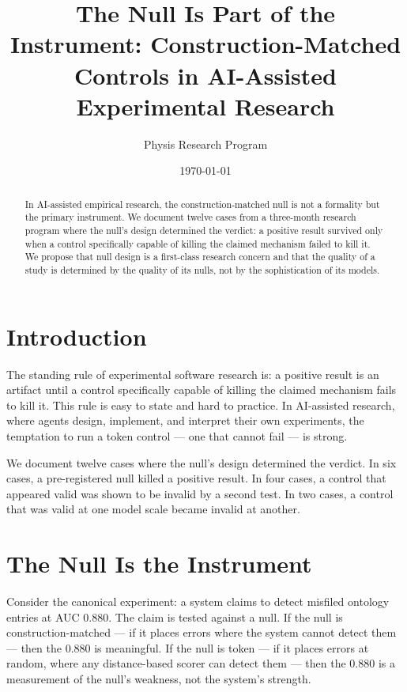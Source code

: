 \documentclass[11pt]{article}
\title{The Null Is Part of the Instrument: Construction-Matched Controls in AI-Assisted Experimental Research}
\author{Physis Research Program}
\date{\today}
\begin{document}
\maketitle

\begin{abstract}
In AI-assisted empirical research, the construction-matched null is not a
formality but the primary instrument. We document twelve cases from a
three-month research program where the null's design determined the
verdict: a positive result survived only when a control specifically
capable of killing the claimed mechanism failed to kill it. We propose
that null design is a first-class research concern and that the quality
of a study is determined by the quality of its nulls, not by the
sophistication of its models.
\end{abstract}

\section{Introduction}

The standing rule of experimental software research is: a positive result
is an artifact until a control specifically capable of killing the
claimed mechanism fails to kill it. This rule is easy to state and hard
to practice. In AI-assisted research, where agents design, implement, and
interpret their own experiments, the temptation to run a token control
--- one that cannot fail --- is strong.

We document twelve cases where the null's design determined the verdict.
In six cases, a pre-registered null killed a positive result. In four
cases, a control that appeared valid was shown to be invalid by a second
test. In two cases, a control that was valid at one model scale became
invalid at another.

\section{The Null Is the Instrument}

Consider the canonical experiment: a system claims to detect misfiled
ontology entries at AUC 0.880. The claim is tested against a null. If
the null is construction-matched --- if it places errors where the system
cannot detect them --- then the 0.880 is meaningful. If the null is
token --- if it places errors at random, where any distance-based scorer
can detect them --- then the 0.880 is a measurement of the null's
weakness, not the system's strength.
\end{document}
